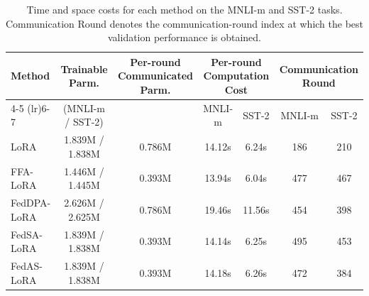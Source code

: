 \documentclass[lettersize,journal]{IEEEtran}
\begin{document}
        		\begin{table}[htbp]
			\centering
			\small
			\setlength{\tabcolsep}{2.5pt}
			\renewcommand{\arraystretch}{1.08}
			\begin{tabular}{@{}lcccccc@{}}
				\toprule
				Method
				&  Trainable Parm.
				&  Per-round Communicated Parm.
				& \multicolumn{2}{c}{ Per-round Computation Cost}
				& \multicolumn{2}{c}{Communication Round} \\
				\cmidrule(lr){4-5}
				\cmidrule(lr){6-7}
				& (MNLI-m / SST-2)
				&
				& MNLI-m
				& SST-2
				& MNLI-m
				& SST-2 \\
				\midrule
				
				LoRA
				& 1.839M / 1.838M
				& 0.786M
				& 14.12s
				& 6.24s
				& 186
				& 210 \\
				
				FFA-LoRA
				& 1.446M / 1.445M
				& 0.393M
				& 13.94s
				& 6.04s
				& 477
				& 467 \\
				
				FedDPA-LoRA
				& 2.626M / 2.625M
				& 0.786M
				& 19.46s
				& 11.56s
				& 454
				& 398 \\
				
				FedSA-LoRA
				& 1.839M / 1.838M
				& 0.393M
				& 14.14s
				& 6.25s
				& 495
				& 453 \\
				
				FedAS-LoRA
				& 1.839M / 1.838M
				& 0.393M
				& 14.18s
				& 6.26s
				& 472
				& 384 \\
				\bottomrule
			\end{tabular}
			\caption{Time and space costs for each method on the MNLI-m and SST-2
				tasks. Communication Round denotes the communication-round index
				at which the best validation performance is obtained.}
			\label{tab:time_space_cost_mnli_sst2}
		\end{table}
        
\end{document}
